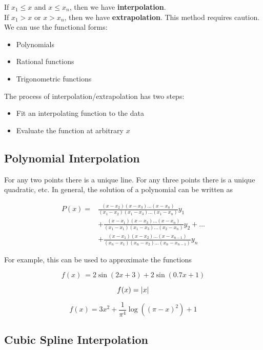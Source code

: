 \documentclass[]{article}
\begin{document}
If $x_1 \leq x$ and $x \leq x_n$, then we have \textbf{interpolation}.\\
If $x_1 > x$ or $x > x_n$, then we have \textbf{extrapolation}. This method requires caution.\\

We can use the functional forms:

\begin{itemize}
	\item Polynomials
	\item Rational functions
	\item Trigonometric functions
\end{itemize}\bigbreak

The process of interpolation/extrapolation has two steps:

\begin{itemize}
	\item Fit an interpolating function to the data
	\item Evaluate the function at arbitrary $x$
\end{itemize}\bigbreak

\subsection{Polynomial Interpolation}\bigbreak

For any two points there is a unique line. For any three points there is a unique quadratic, etc. In general, the solution of a polynomial can be written as

\begin{align*}
	P(x) = &\frac{(x-x_2)(x-x_3)...(x-x_n)}{(x_1-x_2)(x_1-x_3)...(x_1-x_n)}y_1 \\
	&+ \frac{(x-x_1)(x-x_3)...(x-x_n)}{(x_1-x_1)(x_1-x_3)...(x_2-x_n)}y_2 + ... \\
	&+ \frac{(x-x_1)(x-x_2)...(x-x_{n-1})}{(x_n-x_1)(x_n-x_2)...(x_n-x_{n-1})}y_n
\end{align*}\bigbreak

For example, this can be used to approximate the functions

\[f(x)\ = 2\sin(2x+3) + 2\sin(0.7x+1)\]

\[f(x) = \abs{x}\]

\[f(x) = 3x^2 + \frac{1}{\pi^4}\log\left((\pi - x)^2\right) + 1\]

\subsection{Cubic Spline Interpolation}\bigbreak
\end{document}

